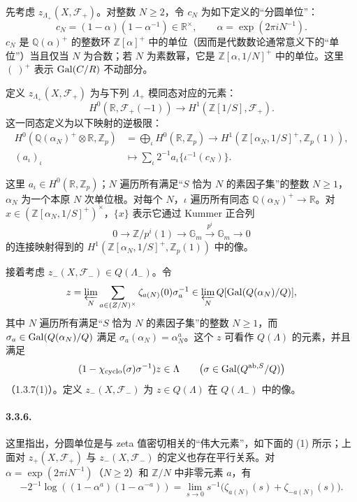 先考虑 $z_{\Lambda_+}(X,\mathcal F_+)$。对整数 $N\ge2$，令 $c_N$ 为如下定义的“分圆单位”：
\[
 c_N=(1-\alpha)(1-\alpha^{-1})\in\mathbb R^\times,
 \qquad\alpha=\exp(2\pi iN^{-1}).
\]
$c_N$ 是 $\mathbb Q(\alpha)^+$ 的整数环 $\mathbb Z[\alpha]^+$ 中的单位（因而是代数数论通常意义下的“单位”）当且仅当 $N$ 为合数；若 $N$ 为素数幂，它是 $\mathbb Z[\alpha,1/N]^+$ 中的单位。这里 $(\ )^+$ 表示 $\operatorname{Gal}(C/R)$ 不动部分。

定义 $z_{\Lambda_+}(X,\mathcal F_+)$ 为与下列 $\Lambda_+$ 模同态对应的元素：
\[
 H^0(\mathbb R,\mathcal F_+(-1))\longrightarrow H^1(\mathbb Z[1/S],\mathcal F_+).
\]
这一同态定义为以下映射的逆极限：
\begin{align*}
 H^0(\mathbb Q(\alpha_N)^+\otimes\mathbb R,\mathbb Z_p)
 &=\bigoplus_\iota H^0(\mathbb R,\mathbb Z_p)
 \longrightarrow H^1(\mathbb Z[\alpha_N,1/S]^+,\mathbb Z_p(1)),\\
 (a_\iota)_\iota&\longmapsto
 \sum_\iota2^{-1}a_\iota\{\iota^{-1}(c_N)\}.
\end{align*}

这里 $a_\iota\in H^0(\mathbb R,\mathbb Z_p)$；$N$ 遍历所有满足“$S$ 恰为 $N$ 的素因子集”的整数 $N\ge1$，$\alpha_N$ 为一个本原 $N$ 次单位根。对每个 $N$，$\iota$ 遍历所有同态 $\mathbb Q(\alpha_N)^+\to\mathbb R$。对 $x\in(\mathbb Z[\alpha_N,1/S]^+)^\times$，$\{x\}$ 表示它通过 Kummer 正合列
\[
 0\longrightarrow\mathbb Z/p^i(1)\longrightarrow\mathbb G_m
 \xrightarrow{p^i}\mathbb G_m\longrightarrow0
\]
的连接映射得到的 $H^1(\mathbb Z[\alpha_N,1/S]^+,\mathbb Z_p(1))$ 中的像。

接着考虑 $z_-(X,\mathcal F_-)\in Q(\Lambda_-)$。令
\[
 z=\varprojlim_N\sum_{a\in(Z/N)^\times}\zeta_{a(N)}(0)\sigma_a^{-1}
 \in\varprojlim_NQ[\operatorname{Gal}(Q(\alpha_N)/Q)],
\]
其中 $N$ 遍历所有满足“$S$ 恰为 $N$ 的素因子集”的整数 $N\ge1$，而 $\sigma_a\in\operatorname{Gal}(Q(\alpha_N)/Q)$ 满足 $\sigma_a(\alpha_N)=\alpha_N^a$。这个 $z$ 可看作 $Q(\Lambda)$ 的元素，并且满足
\[
 (1-\chi_{\mathrm{cyclo}}(\sigma)\sigma^{-1})z\in\Lambda
 \qquad\bigl(\sigma\in\operatorname{Gal}(Q^{\mathrm{ab},S}/Q)\bigr)
\]
（1.3.7(1)）。定义 $z_-(X,\mathcal F_-)$ 为 $z\in Q(\Lambda)$ 在 $Q(\Lambda_-)$ 中的像。

\paragraph{3.3.6.} 这里指出，分圆单位是与 zeta 值密切相关的“伟大元素”，如下面的 (1) 所示；上面对 $z_+(X,\mathcal F_+)$ 与 $z_-(X,\mathcal F_-)$ 的定义也存在平行关系。对 $\alpha=\exp(2\pi iN^{-1})$（$N\ge2$）和 $\mathbb Z/N$ 中非零元素 $a$，有
\begin{equation*}\tag{1}
 -2^{-1}\log((1-\alpha^a)(1-\alpha^{-a}))
 =\lim_{s\to0}s^{-1}\bigl(\zeta_{a(N)}(s)+\zeta_{-a(N)}(s)\bigr).
\end{equation*}

